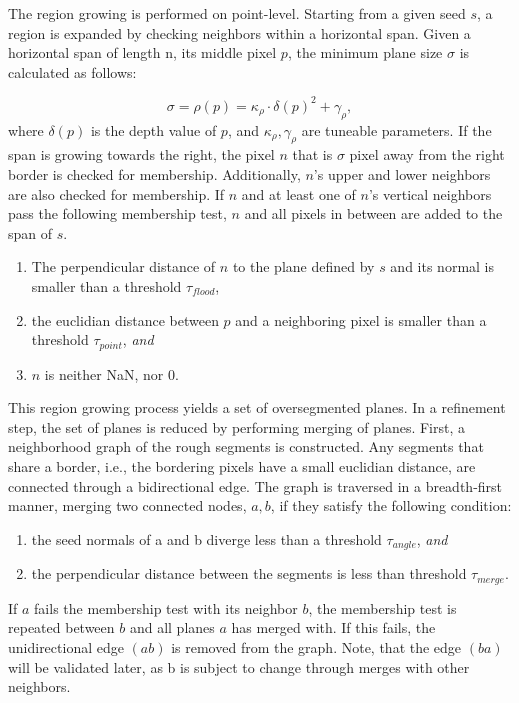 \documentclass[main.tex]{subfiles}
\begin{document}
The region growing is performed on point-level. Starting from a given seed $s$, a region is expanded by checking
neighbors within a horizontal span.
Given a horizontal span of length n, its middle pixel $p$, the minimum plane size $\sigma$ is calculated as follows:

\begin{equation}
    \sigma = \rho(p) = \kappa_\rho \cdot \delta(p)^2 + \gamma_\rho,
\end{equation}
where $\delta(p)$ is the depth value of $p$, and $\kappa_\rho, \gamma_\rho$ are tuneable parameters.
If the span is growing towards the right, the pixel $n$ that is $\sigma$ pixel away from the right border is checked
for membership. Additionally, $n$'s upper and lower neighbors are also checked for membership. If $n$ and at least one
of $n$'s vertical neighbors pass the following membership test, $n$ and all pixels in between are added to the span of $s$.

\begin{enumerate}
    \item The perpendicular distance of $n$ to the plane defined by $s$ and its normal is smaller than
          a threshold $\tau_{flood}$,
    \item the euclidian distance between $p$ and a neighboring pixel is smaller than a threshold
          $\tau_{point}$, \textit{and}
    \item $n$ is neither NaN, nor 0.
\end{enumerate}

This region growing process yields a set of oversegmented planes. In a refinement step, the set of planes is reduced
by performing merging of planes.
First, a neighborhood graph of the rough segments is constructed. Any segments that share a border, i.e., the bordering
pixels have a small euclidian distance, are connected through a bidirectional edge.
The graph is traversed in a breadth-first manner, merging two connected nodes, $a,b$, if they satisfy the following condition:

\begin{enumerate}
    \item the seed normals of a and b diverge less than a threshold $\tau_{angle}$, \textit{and}
    \item the perpendicular distance between the segments is less than threshold $\tau_{merge}$.
\end{enumerate}
If $a$ fails the membership test with its neighbor $b$, the membership test is repeated between $b$ and all planes $a$
has merged with. If this fails, the unidirectional edge $(ab)$ is removed from the graph. Note, that the edge $(ba)$ will
be validated later, as b is subject to change through merges with other neighbors.
\end{document}
